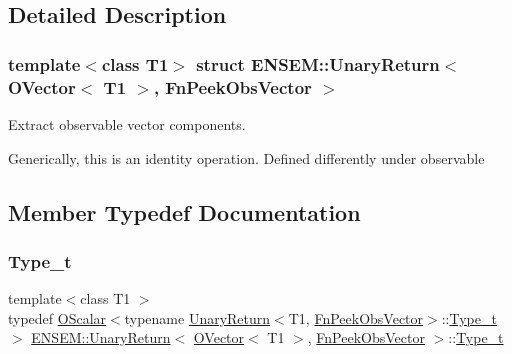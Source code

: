 \subsection{Detailed Description}
\subsubsection*{template$<$class T1$>$\newline
struct E\+N\+S\+E\+M\+::\+Unary\+Return$<$ O\+Vector$<$ T1 $>$, Fn\+Peek\+Obs\+Vector $>$}

Extract observable vector components. 

Generically, this is an identity operation. Defined differently under observable 

\subsection{Member Typedef Documentation}
\mbox{\label{structENSEM_1_1UnaryReturn_3_01OVector_3_01T1_01_4_00_01FnPeekObsVector_01_4_a389e8e049203dcaaa7ef75769364c944}} 
\subsubsection{\texorpdfstring{Type\_t}{Type\_t}\hspace{0.1cm}{\footnotesize\ttfamily [1/3]}}
{\footnotesize\ttfamily template$<$class T1 $>$ \\
typedef \mbox{\hyperlink{classENSEM_1_1OScalar}{O\+Scalar}}$<$typename \mbox{\hyperlink{structENSEM_1_1UnaryReturn}{Unary\+Return}}$<$T1, \mbox{\hyperlink{structENSEM_1_1FnPeekObsVector}{Fn\+Peek\+Obs\+Vector}}$>$\+::\mbox{\hyperlink{structENSEM_1_1UnaryReturn_3_01OVector_3_01T1_01_4_00_01FnPeekObsVector_01_4_a389e8e049203dcaaa7ef75769364c944}{Type\+\_\+t}}$>$ \mbox{\hyperlink{structENSEM_1_1UnaryReturn}{E\+N\+S\+E\+M\+::\+Unary\+Return}}$<$ \mbox{\hyperlink{classENSEM_1_1OVector}{O\+Vector}}$<$ T1 $>$, \mbox{\hyperlink{structENSEM_1_1FnPeekObsVector}{Fn\+Peek\+Obs\+Vector}} $>$\+::\mbox{\hyperlink{structENSEM_1_1UnaryReturn_3_01OVector_3_01T1_01_4_00_01FnPeekObsVector_01_4_a389e8e049203dcaaa7ef75769364c944}{Type\+\_\+t}}}

